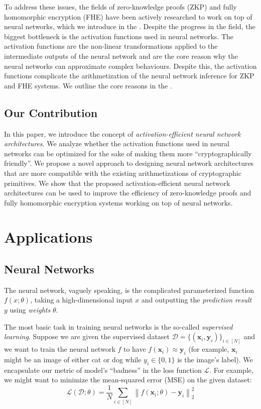 \documentclass[12pt,a4paper,oneside]{book}
\theoremstyle{dplplain}
\theoremstyle{dpldefinition}
\theoremstyle{dplremark}
\begin{document}
To address these issues, the fields of zero-knowledge proofs (ZKP) and fully
homomorphic encryption (FHE) have been actively researched to work on top of
neural networks, which we introduce in the . Despite
the progress in the field, the biggest bottleneck is the activation functions
used in neural networks. The activation functions are the non-linear
transformations applied to the intermediate outputs of the neural network and
are the core reason why the neural networks can approximate complex behaviours.
Despite this, the activation functions complicate the arithmetization of the
neural network inference for ZKP and FHE systems. We outline the core reasons 
in the .

\section{Our Contribution}\label{section:our_contribution}

In this paper, we introduce the concept of \textit{activation-efficient neural
network architectures}. We analyze whether the activation functions used in
neural networks can be optimized for the sake of making them more
``cryptographically friendly''. We propose a novel approach to designing neural
network architectures that are more compatible with the existing
arithmetizations of cryptographic primitives. We show that the proposed
activation-efficient neural network architectures can be used to improve the
efficiency of zero-knowledge proofs and fully homomorphic encryption systems
working on top of neural networks.

\chapter{Applications}\label{section:preliminaries}

\section{Neural Networks}

The neural network, vaguely speaking, is the complicated parameterized function 
$f(x;\theta)$, taking a high-dimensional input $x$
and outputting the \textit{prediction result} $y$ using \textit{weights} $\theta$. 

The most basic task in training neural networks is the so-called
\textit{supervised learning}. Suppose we are given the supervised dataset
$\mathcal{D} = \{(\mathbf{x}_i, \mathbf{y}_i)\}_{i \in [N]}$ and we want to
train the neural network $f$ to have $f(\mathbf{x}_i) \approx \mathbf{y}_i$ (for
example, $\mathbf{x}_i$ might be an image of either cat or dog while $y_i \in
\{0,1\}$ is the image's label). We encapsulate our metric of model's ``badness''
in the loss function $\mathcal{L}$. For example, we might want to minimize the 
mean-squared error (MSE) on the given dataset:
\begin{equation*}
    \mathcal{L}(\mathcal{D};\theta) = \frac{1}{N} \sum_{i \in [N]} \left\|f(\mathbf{x}_i;\theta) - \mathbf{y}_i\right\|_2^2
\end{equation*}
\end{document}
